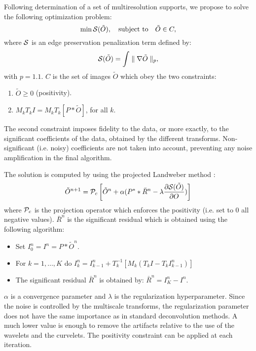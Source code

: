 Following determination of a set of multiresolution supports, 
we propose to solve
the following optimization problem:
\begin{equation}
  \label{eq:dec-min}
  \min {\mathcal S}(\tilde O), \quad \mbox{subject to} \quad \tilde O \in C,  
\end{equation}
where ${\mathcal S}$ is an edge preservation penalization term defined by:
\[ {\mathcal S}(\tilde O) = \int \parallel \nabla \tilde O \parallel_p, \] 
with $p=1.1$.
 $C$ is the set of images $\tilde{O}$ 
which obey the two constraints:
\begin{enumerate}
\item $\tilde{O} \ge 0$ (positivity).
\item $ M_k T_k I = M_k T_k [P *\tilde{O}]$, for all $k$. 
\end{enumerate}
The second constraint
imposes fidelity to the data, or more exactly, 
to the significant coefficients of the data, 
obtained by the different transforms.
Non-significant (i.e. noisy) coefficients are not taken into account, 
preventing any noise amplification in the final algorithm.

The solution is computed by using the 
projected Landweber method \cite{ima:bertero98}:
\begin{eqnarray}
\tilde O^{n+1} = {{\mathcal P}}_c \left[ 
\tilde O^n + \alpha( P^* * {\bar R}^n - \lambda \frac{\partial {\mathcal S}(\tilde O)}{\partial O}) \right]
\end{eqnarray}
where ${{\mathcal P}}_c$ is the projection operator which enforces the positivity
(i.e. set to 0 all negative values).
${\bar R}^n$ is the significant residual which
 is obtained using the following algorithm:
\begin{itemize}
\item Set $I^n_{0} = I^n = P * \tilde O^n$.
\item For $k=1,\dots,K$ do 
$
I^n_k = I^n_{k-1} + T_k^{-1} \left[ M_k (T_k I - T_k I^n_{k-1}) \right] \nonumber
$
\item The significant residual ${\bar R}^n$ is obtained by:
  $ {\bar R}^n = I^n_K - I^n $.
\end{itemize}

$\alpha$ is a convergence parameter and $\lambda$ is the 
regularization hyperparameter. Since the noise is controlled by the
multiscale transforms, the regularization parameter does not   
have the same importance as in standard deconvolution methods.
A much lower value is enough to remove the artifacts relative to the
use of the wavelets and the curvelets. The positivity constraint can
be applied at each iteration.

